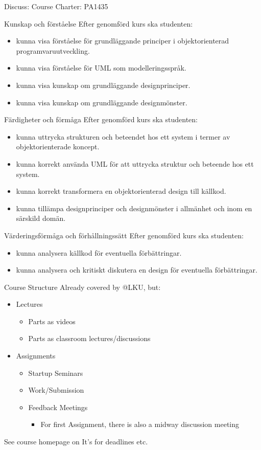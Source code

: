 \documentclass[10pt,t,a4paper]{beamer}
\begin{document}
\begin{frame}[shrink=15,label=sec-3]{Discuss: Course Charter: PA1435}

\alert{Kunskap och förståelse} Efter genomförd kurs ska studenten:
\begin{itemize}
\item kunna visa förståelse för grundläggande principer i objektorienterad programvaruutveckling.
\item kunna visa förståelse för UML som modelleringsspråk.
\item kunna visa kunskap om grundläggande designprinciper.
\item kunna visa kunskap om grundläggande designmönster.
\end{itemize}

\alert{Färdigheter och förmåga} Efter genomförd kurs ska studenten:
\begin{itemize}
\item kunna uttrycka strukturen och beteendet hos ett system i termer av objektorienterade koncept.
\item kunna korrekt använda UML för att uttrycka struktur och beteende hos ett system.
\item kunna korrekt transformera en objektorienterad design till källkod.
\item kunna tillämpa designprinciper och designmönster i allmänhet och inom en särskild domän.
\end{itemize}

\alert{Värderingsförmåga och förhållningssätt} Efter genomförd kurs ska studenten:
\begin{itemize}
\item kunna analysera källkod för eventuella förbättringar.
\item kunna analysera och kritiskt diskutera en design för eventuella förbättringar.
\end{itemize}
\end{frame}
\begin{frame}[label=sec-4]{Course Structure}
Already covered by @LKU, but:
\begin{itemize}
\item Lectures
\begin{itemize}
\item Parts as videos
\item Parts as classroom lectures/discussions
\end{itemize}
\item Assignments
\begin{itemize}
\item Startup Seminars
\item Work/Submission
\item Feedback Meetings
\begin{itemize}
\item For first Assignment, there is also a midway discussion meeting
\end{itemize}
\end{itemize}
\end{itemize}

See course homepage on It's for deadlines etc.        
\end{frame}
\end{document}
